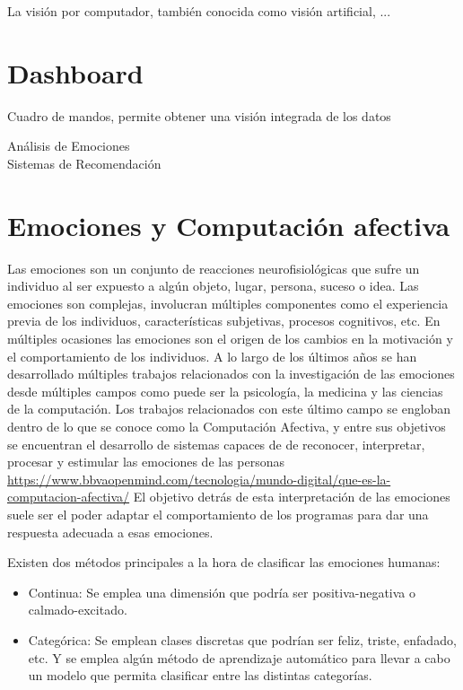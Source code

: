 La visión por computador, también conocida como visión artificial, ...

\section{Dashboard}

Cuadro de mandos, permite obtener una visión integrada de los datos





Análisis de Emociones\\
Sistemas de Recomendación\\


\section{Emociones y Computación afectiva}

Las emociones son un conjunto de reacciones neurofisiológicas que sufre un individuo al ser expuesto a algún objeto, lugar, persona, suceso o idea. Las emociones son complejas, involucran múltiples componentes como el experiencia previa de los individuos, características subjetivas, procesos cognitivos, etc. En múltiples ocasiones las emociones son el origen de los cambios en la motivación y el comportamiento de los individuos. A lo largo de los últimos años se han desarrollado múltiples trabajos relacionados con la investigación de las emociones desde múltiples campos como puede ser la psicología, la medicina y las ciencias de la computación. Los trabajos relacionados con este último campo se engloban dentro de lo que se conoce como la Computación Afectiva, y entre sus objetivos se encuentran el desarrollo de sistemas capaces de de reconocer, interpretar, procesar y estimular las emociones de las personas \url{https://www.bbvaopenmind.com/tecnologia/mundo-digital/que-es-la-computacion-afectiva/} El objetivo detrás de esta interpretación de las emociones suele ser el poder adaptar el comportamiento de los programas para dar una respuesta adecuada a esas emociones.

Existen dos métodos principales a la hora de clasificar las emociones humanas:
\begin{itemize}
    \item Continua: Se emplea una dimensión que podría ser positiva-negativa o calmado-excitado.
    \item Categórica: Se emplean clases discretas que podrían ser feliz, triste, enfadado, etc. Y se emplea algún método de aprendizaje automático para llevar a cabo un modelo que permita clasificar entre las distintas categorías.
\end{itemize}

